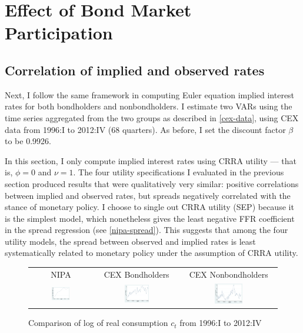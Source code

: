 \section{Effect of Bond Market Participation}

\subsection{Correlation of implied and observed rates}
Next, I follow the same framework in computing Euler equation implied interest rates for both bondholders and nonbondholders. I estimate two VARs using the time series aggregated from the two groups as described in \autoref{cex-data}, using CEX data from 1996:I to 2012:IV (68 quarters). As before, I set the discount factor $\beta$ to be 0.9926.

In this section, I only compute implied interest rates using CRRA utility --- that is, $\phi = 0$ and $\nu = 1$. The four utility specifications I evaluated in the previous section produced results that were qualitatively very similar: positive correlations between implied and observed rates, but spreads negatively correlated with the stance of monetary policy. I choose to single out CRRA utility (SEP) because it is the simplest model, which nonetheless gives the least negative FFR coefficient in the spread regression (see \autoref{nipa-spread}). This suggests that among the four utility models, the spread between observed and implied rates is least systematically related to monetary policy under the assumption of CRRA utility.

\begin{figure}[b]
\centering
\captionsetup{singlelinecheck=false, justification=centering}
\begin{tabular}{ccc}
NIPA & CEX Bondholders & CEX Nonbondholders \\
\includegraphics[width=0.31\textwidth]{figs/nipa/log_consumption} &
\includegraphics[width=0.31\textwidth]{figs/cex/log_consumption_bh} &
\includegraphics[width=0.31\textwidth]{figs/cex/log_consumption_nbh}
\end{tabular}
\caption{Comparison of log of real consumption $c_t$ from 1996:I to 2012:IV}
\label{log_consumption_series}
\end{figure}

